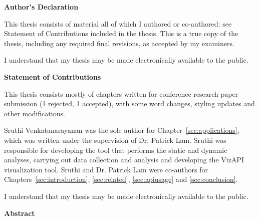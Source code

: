 \cleardoublepage %

\begin{center}\textbf{Author's Declaration}\end{center}
  \noindent
This thesis consists of material all of which I authored or co-authored: see Statement of Contributions included in the thesis. This is a true copy of the thesis, including any required final revisions, as accepted by my examiners.

  \bigskip
  
  \noindent
I understand that my thesis may be made electronically available to the public.

\cleardoublepage

\begin{center}\textbf{Statement of Contributions}\end{center}
   \noindent
This thesis consists mostly of chapters written for conference research paper submission
(1 rejected, 1 accepted), with some word changes, styling updates and other modifications.

Sruthi Venkatanarayanan was the sole author for Chapter~\ref{sec:applications}, which was written under the
supervision of Dr. Patrick Lam. Sruthi was responsible for developing the tool that performs the static and dynamic analyses, 
carrying out data collection and analysis and developing the VizAPI visualization tool.
Sruthi and Dr. Patrick Lam were co-authors for Chapters~\ref{sec:introduction}, \ref{sec:related}, \ref{sec:apiusage} and \ref{sec:conclusion}.
  \bigskip
  
  \noindent
I understand that my thesis may be made electronically available to the public.

\cleardoublepage



\begin{center}\textbf{Abstract}\end{center}

